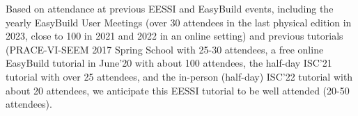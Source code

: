
Based on attendance at previous EESSI and EasyBuild events, including the yearly EasyBuild User Meetings (over 30 attendees in the last physical edition in 2023, close to 100 in 2021 and 2022 in an online setting) and previous tutorials (PRACE-VI-SEEM 2017 Spring School with 25-30 attendees, a free online EasyBuild tutorial in June'20 with about 100 attendees, the half-day ISC'21 tutorial with over 25 attendees, and the in-person (half-day) ISC'22 tutorial with about 20 attendees, we anticipate this EESSI tutorial to be well attended (20-50 attendees).





